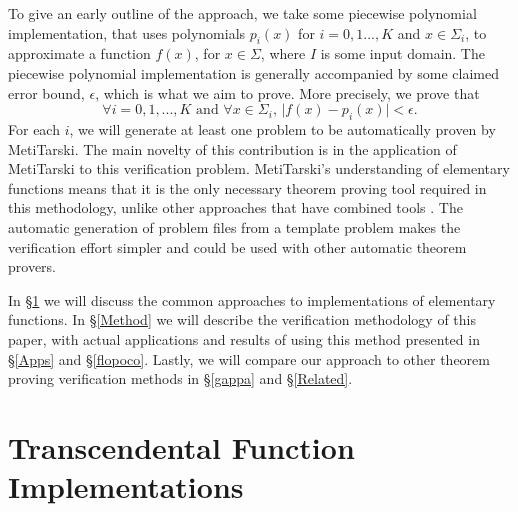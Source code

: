 \documentclass{fac}
\newcommand{\abs}[1]{\lvert#1\rvert}
\begin{document}
To give an early outline of the approach, we take some piecewise polynomial implementation, that uses polynomials $p_i(x)$ for $i=0,1...,K$ and $x \in \Sigma_i$, to approximate a function $f(x)$, for $x\in \Sigma$, where $I$ is some input domain. The piecewise polynomial implementation is generally accompanied by some claimed error bound, $\epsilon$, which is what we aim to prove. More precisely, we prove that
\begin{equation*}
    \forall i=0,1,...,K \textrm{ and } \forall x\in \Sigma_i, \, \abs{f(x)-p_i(x)}<\epsilon.
\end{equation*}
For each $i$, we will generate at least one problem to be automatically proven by MetiTarski. The main novelty of this contribution is in the application of MetiTarski to this verification problem. MetiTarski's understanding of elementary functions means that it is the only necessary theorem proving tool required in this methodology, unlike other approaches that have combined tools \cite{5483294}. The automatic generation of problem files from a template problem makes the verification effort simpler and could be used with other automatic theorem provers.

In \S \ref{trans functs} we will discuss the common approaches to implementations of elementary functions. In \S \ref{Method} we will describe the verification methodology of this paper, with actual applications and results of using this method presented in \S \ref{Apps} and \S \ref{flopoco}. Lastly, we will compare our approach to other theorem proving verification methods in \S \ref{gappa} and \S \ref{Related}.


\section{Transcendental Function Implementations}
\label{trans functs}
\end{document}
